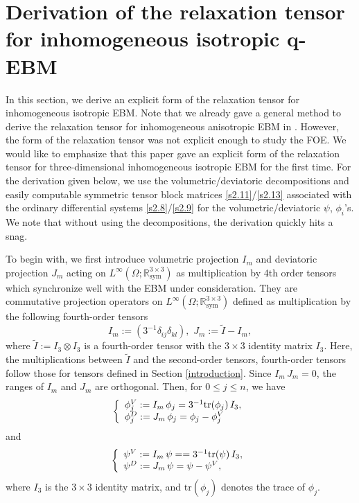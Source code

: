 \documentclass[a4paper,12pt]{article}
\newtheorem{a priori condition}[Th]{A priori condition}
\begin{document}
\section{Derivation of the relaxation tensor for inhomogeneous isotropic q-EBM }\label{formula I-EBM}
\setcounter{equation}{0}
In this section, we derive an explicit form of the relaxation tensor for inhomogeneous isotropic EBM. Note that we already gave a general method to derive the relaxation tensor for inhomogeneous anisotropic EBM in \cite{HKLNT}. However, the form of the relaxation tensor was not explicit enough to study the FOE. We would like to emphasize that this paper gave an explicit form of the relaxation tensor for three-dimensional inhomogeneous isotropic EBM for the first time. For the derivation given below, we use the volumetric/deviatoric decompositions and easily computable symmetric tensor block matrices \eqref{s2.11}/\eqref{s2.13} associated with the ordinary differential systems \eqref{s2.8}/\eqref{s2.9} for the volumetric/deviatoric $\psi$, $\phi_i$'s. We note that without using the decompositions, the derivation quickly hits a snag.

To begin with, we first introduce volumetric projection $I_m$ and deviatoric projection $J_m$ acting on $L^\infty(\Omega;{\mathbb R}^{3\times3}_{\text{sym}})$ as multiplication by 4th order tensors which synchronize well with the EBM under consideration. They are commutative projection operators on $L^\infty(\Omega;{\mathbb R}^{3\times3}_{\text{sym}})$ defined as multiplication by the following fourth-order tensors
\begin{equation}\label{I-J}
I_m:=(3^{-1}\delta_{ij}\delta_{kl}),\,\,J_m:=\tilde I-I_m,    
\end{equation}
where $\tilde I:=I_3\otimes I_3$ is a fourth-order tensor with the $3\times3$ identity matrix $I_3$. Here, the multiplications between $\tilde I$ and the second-order tensors, fourth-order tensors follow those for tensors defined in Section \ref{introduction}. Since $I_m\,J_m=0$, the ranges of $I_m$ and $J_m$ are orthogonal.
Then, for $0\leq j\leq n$, we have
\begin{equation}\label{s2.2}
\left\{
\begin{array}{l}
\phi^V_j:=I_m\, \phi_j=3^{-1}{\rm tr} (\phi_j)\,I_3,\\
\phi^D_j:=J_m\,\phi_j=\phi_j-\phi^V_j
\end{array}
\right.
\end{equation}
and
\begin{equation}\label{s2.3}
\left\{
\begin{array}{l}
\psi^V:=I_m\,\psi==3^{-1}{\rm tr} (\psi)\,I_3,\\
\psi^D:=J_m\,\psi=\psi-\psi^V,
\end{array}
\right.
\end{equation}
where $I_3$ is the $3\times3$ identity matrix, and $\text{tr}(\phi_j)$ denotes the trace of $\phi_j$.
\end{document}
